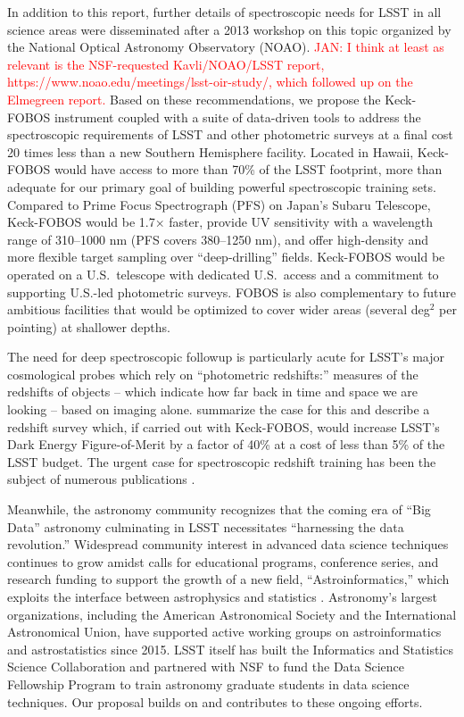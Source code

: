 \documentclass[oneside,11pt]{amsart}
\begin{document}
In addition to this report, further details of spectroscopic needs for LSST in all science areas were disseminated
after a 2013 workshop on this topic organized by the National Optical Astronomy Observatory (NOAO).
\textcolor{red}{JAN: I think at least as relevant is the NSF-requested Kavli/NOAO/LSST report,
https://www.noao.edu/meetings/lsst-oir-study/, which followed up on the Elmegreen report.} Based on these
recommendations, we propose the Keck-FOBOS instrument coupled with a suite of data-driven tools to address the
spectroscopic requirements of LSST and other photometric surveys at a final cost 20 times less than a new Southern
Hemisphere facility. Located in Hawaii, Keck-FOBOS would have access to more than 70\% of the LSST footprint, more than
adequate for our primary goal of building powerful spectroscopic training sets.  Compared to Prime Focus Spectrograph
(PFS) on Japan's Subaru Telescope, Keck-FOBOS would be 1.7$\times$ faster, provide UV sensitivity with a wavelength
range of 310--1000 nm (PFS covers 380--1250 nm), and offer high-density and more flexible target sampling over
``deep-drilling'' fields.  Keck-FOBOS would be operated on a U.S.\ telescope with dedicated U.S.\ access and a
commitment to supporting U.S.-led photometric surveys.  FOBOS is also complementary to future ambitious facilities that
would be optimized to cover wider areas (several deg$^2$ per pointing) at shallower depths.

The need for deep spectroscopic followup is particularly acute for LSST's major cosmological probes which rely on
``photometric redshifts:'' measures of the redshifts of objects -- which indicate how far back in time and space we are
looking -- based on imaging alone.  \citet{newman15} summarize the case for this and describe a redshift survey which,
if carried out with Keck-FOBOS, would increase LSST's Dark Energy Figure-of-Merit by a factor of 40\% at a cost of less
than 5\% of the LSST budget.  The urgent case for spectroscopic redshift training has been the subject of numerous
publications \citep[e.g.,][]{laureijs11,masters15, hemmati18}.

Meanwhile, the astronomy community recognizes that the coming era of ``Big Data'' astronomy culminating in LSST
necessitates ``harnessing the data revolution.''  Widespread community interest in advanced data science techniques
continues to grow amidst calls for educational programs, conference series, and research funding to support the
growth of a new field, ``Astroinformatics,'' which exploits the interface between astrophysics and statistics
\citep{borne09}.  Astronomy's largest organizations, including the American Astronomical Society and the International
Astronomical Union, have supported active working groups on astroinformatics and astrostatistics since 2015.  LSST
itself has built the Informatics and Statistics Science Collaboration and partnered with NSF to fund the Data Science
Fellowship Program to train astronomy graduate students in data science techniques.  Our proposal builds on and
contributes to these ongoing efforts.
\end{document}
